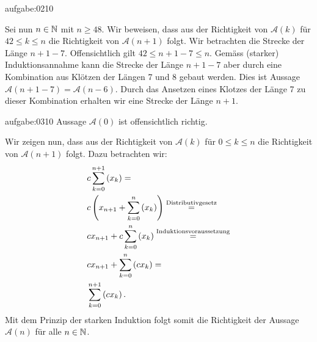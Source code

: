 \begin{antwort}{aufgabe:0210}
\begin{aenum}
Sei nun $n\in\mathbb{N}$ mit $n\geq 48$. Wir beweisen, dass aus der Richtigkeit von $\mathcal{A}(k)$ für $42\leq k \leq n$ die Richtigkeit von $\mathcal{A}(n+1)$ folgt. Wir betrachten die Strecke der Länge $n+1-7$. Offensichtlich gilt $42\leq n+1-7\leq n$. Gemäss (starker) Induktionsannahme kann die Strecke der Länge $n+1-7$ aber durch eine Kombination aus Klötzen der Längen 7 und 8 gebaut werden. Dies ist Aussage $\mathcal{A}(n+1-7) = \mathcal{A}(n-6)$. Durch das Ansetzen eines Klotzes der Länge 7 zu dieser Kombination erhalten wir eine Strecke der Länge $n+1$.
\end{aenum}
\end{antwort}


\begin{antwort}{aufgabe:0310}
Aussage $\mathcal{A}(0)$ ist offensichtlich richtig.

Wir zeigen nun, dass aus der Richtigkeit von $\mathcal{A}(k)$ für $0\leq k\leq n$ die Richtigkeit von $\mathcal{A}(n+1)$ folgt. Dazu betrachten wir:
\begin{align*}
    &c\sum_{k=0}^{n+1}\left(x_k\right) = \\
    &c\left(x_{n+1} + \sum_{k=0}^{n}\left(x_k\right)\right) \stackrel{\text{Distributivgesetz}}{=} \\
    &cx_{n+1} + c\sum_{k=0}^{n}\left(x_k\right) \stackrel{\text{Induktionsvoraussetzung}}{=} \\
    &cx_{n+1} + \sum_{k=0}^{n}\left(cx_k\right) = \\
    &\sum_{k=0}^{n+1}\left(cx_k\right).
\end{align*}
Mit dem Prinzip der starken Induktion folgt somit die Richtigkeit der Aussage $\mathcal{A}(n)$ für alle $n\in\mathbb{N}$.
\end{antwort}
    

\clearpage
\shipoutAnswer